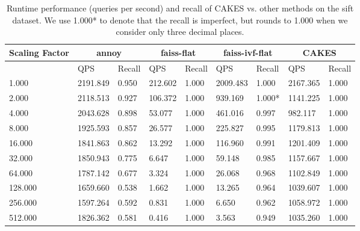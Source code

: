 \begin{table}[!t]
    \caption{Runtime performance (queries per second) and recall of CAKES vs. other methods on the sift dataset. We use 1.000* to denote that the recall is imperfect, but rounds to 1.000 when we consider only three decimal places.}
    \label{table:results:ann-fashion}
    \vskip 0.15in
    \begin{center}
        \begin{small}
            \begin{sc}
                \begin{tabular}{|l|p{1cm}|p{1cm}|p{1cm}|p{1cm}|p{1cm}|p{1cm}|p{1cm}|p{1cm}|}
                    \hline
                    \textbf{Scaling Factor}  & \multicolumn{2}{|c|}{\textbf{annoy}} & \multicolumn{2}{|c|}{\textbf{faiss-flat}} & \multicolumn{2}{|c|}{\textbf{faiss-ivf-flat}}  & \multicolumn{2}{|c|}{\textbf{CAKES}} \\
                    \hline
                    &             QPS & Recall        & QPS & Recall      & QPS & Recall       & QPS & Recall       \\
                    \hline
                    1.000 & 2191.849 & 0.950 & 212.602 & 1.000 & 2009.483 & 1.000 & 2167.365 & 1.000 \\
                    \hline
                    2.000 & 2118.513 & 0.927 & 106.372 & 1.000 & 939.169 & 1.000* & 1141.225 & 1.000 \\
                    \hline
                    4.000 & 2043.628 & 0.898 & 53.077 & 1.000 & 461.016 & 0.997 & 982.117 & 1.000 \\
                    \hline
                    8.000 & 1925.593 & 0.857 & 26.577 & 1.000 & 225.827 & 0.995 & 1179.813 & 1.000 \\
                    \hline
                    16.000 & 1841.863 & 0.862 & 13.292 & 1.000 & 116.960 & 0.991 & 1201.409 & 1.000 \\
                    \hline
                    32.000 & 1850.943 & 0.775 & 6.647 & 1.000 & 59.148 & 0.985 & 1157.667 & 1.000 \\
                    \hline
                    64.000 & 1787.142 & 0.677 & 3.324 & 1.000 & 26.068 & 0.968 & 1102.849 & 1.000 \\
                    \hline
                    128.000 & 1659.660 & 0.538 & 1.662 & 1.000 & 13.265 & 0.964 & 1039.607 & 1.000 \\
                    \hline
                    256.000 & 1597.264 & 0.592 & 0.831 & 1.000 & 6.650 & 0.962 & 1058.972 & 1.000 \\
                    \hline
                    512.000 & 1826.362 & 0.581 & 0.416 & 1.000 & 3.563 & 0.949 & 1035.260 & 1.000 \\
                    \hline
                \end{tabular}
            \end{sc}
        \end{small}
    \end{center}
    \vskip -0.1in
\end{table}





